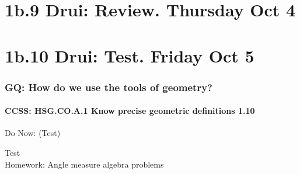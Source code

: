 \documentclass{beamer}
\begin{document}
\section{1b.9 Drui: Review. Thursday Oct 4}

\section{1b.10 Drui: Test. Friday Oct 5}
        \frame
        {
          \frametitle{GQ: How do we use the tools of geometry?}
          \framesubtitle{CCSS: HSG.CO.A.1 Know precise geometric definitions  \alert{1.10}}

          \begin{block}{Do Now: (Test)}
          \end{block}
          Test\\
          \vspace{1cm}
          Homework: Angle measure algebra problems
        }
\end{document}
